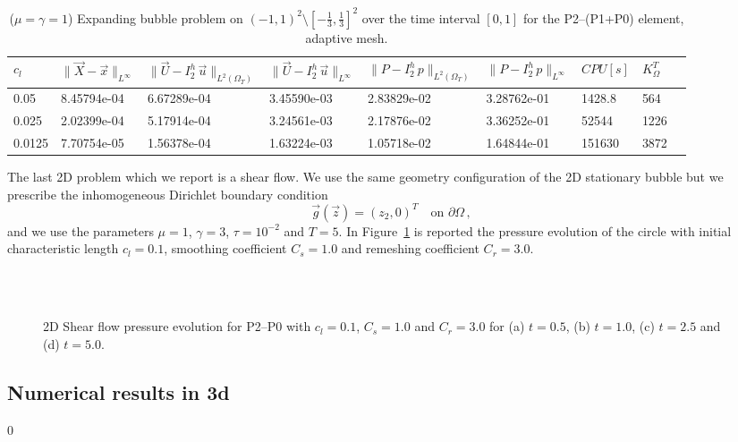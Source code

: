 \documentclass[a4paper,12pt,onecolumn]{article}
\newcommand{\errorXx}{\|\vec{X} - \vec{x}\|_{L^\infty}}
\newcommand{\LerrorUu}[1]{\|\vec U - I^h_{#1}\,\vec u\|_{L^2(\Omega_T)}}
\newcommand{\errorUu}[1]{\|\vec U - I^h_{#1}\,\vec u\|_{L^\infty}}
\newcommand{\errorPp}[1]{\|P - I^h_{#1}\,p\|_{L^\infty}}
\newcommand{\LerrorPp}[1]{\|P - I^h_{#1}\,p\|_{L^2(\Omega_T)}}
\begin{document}
\begin{table}
 \center
 \hspace*{-2cm}
\begin{tabular}{lllllllll}
\hline
$c_l$ & $\errorXx$ & $\LerrorUu2$ & $\errorUu2$ & $\LerrorPp2$ & $\errorPp2$ & $CPU[s]$ & $K_\Omega^T$\\
\hline
0.05 & 8.45794e-04 & 6.67289e-04 & 3.45590e-03 & 2.83829e-02 & 3.28762e-01 & 1428.8 & 564\\
0.025 & 2.02399e-04 & 5.17914e-04 & 3.24561e-03 & 2.17876e-02 & 3.36252e-01 & 52544 & 1226\\
0.0125 & 7.70754e-05 & 1.56378e-04 & 1.63224e-03 & 1.05718e-02 & 1.64844e-01 & 151630 & 3872\\
\hline
\end{tabular}
\hspace*{-2cm}
\caption{($\mu=\gamma=1$) Expanding bubble problem on $(-1,1)^2\setminus[-\frac{1}{3},\frac{1}{3}]^2$ over the time interval $[0,1]$ for the P2--(P1+P0) element, adaptive mesh.}
\label{tab:expandingbubble2Dp2p1p0adaptive}
\end{table}

The last 2D problem which we report is a shear flow. We use the same geometry configuration of the 2D stationary bubble but we prescribe the inhomogeneous Dirichlet boundary condition
\begin{equation*}
\vec g(\vec z)=(z_2,0)^T\quad \mbox{on }\partial\Omega\,,
\end{equation*}
and we use the parameters $\mu=1$, $\gamma=3$, $\tau=10^{-2}$ and $T=5$. In Figure~\ref{fig:shear_2d} is reported the pressure evolution of the circle with initial characteristic length $c_l=0.1$, smoothing coefficient $C_s=1.0$ and remeshing coefficient $C_r=3.0$. 
\begin{figure}[htbp]
  \centering
  \quad
  \\
  \quad
  \\
  \caption{2D Shear flow pressure evolution for P2--P0 with $c_l=0.1$, $C_s=1.0$ and $C_r=3.0$ for (a) $t=0.5$, (b) $t=1.0$, (c) $t=2.5$ and (d) $t=5.0$.}
  \label{fig:shear_2d}
\end{figure}

\subsection{Numerical results in 3d} \label{subsec:numerical_results_3d}
\setcounter{equation} 0
\end{document}
